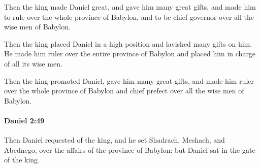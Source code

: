 			\begin{versebox}
					\item[BHS] 
					\item[LXX] 
					\item[ASV] Then the king made Daniel great, and gave him many great gifts, and made him to rule over the whole province of Babylon, and to be chief governor over all the wise men of Babylon.
					\item[NIV] Then the king placed Daniel in a high position and lavished many gifts on him. He made him ruler over the entire province of Babylon and placed him in charge of all its wise men.
					\item[NRSV] Then the king promoted Daniel, gave him many great gifts, and made him ruler over the whole province of Babylon and chief prefect over all the wise men of Babylon.
			\end{versebox}

		\paragraph{Daniel 2:49} %
			\label{DANIEL-2-49}

			Then Daniel requested of the king, and he set Shadrach, Meshach, and Abednego, over the affairs of the province of Babylon: but Daniel sat in the gate of the king.


